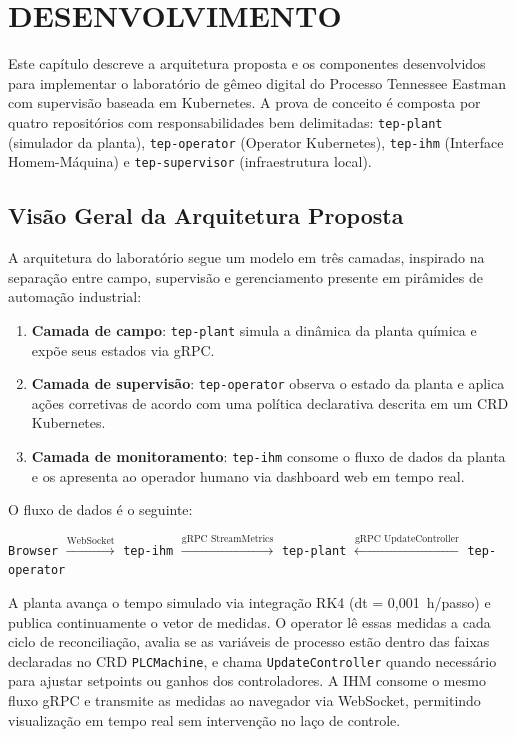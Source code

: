 \chapter{DESENVOLVIMENTO}
\label{cha:desenvolvimento}

Este capítulo descreve a arquitetura proposta e os componentes desenvolvidos para implementar o laboratório de gêmeo digital do Processo Tennessee Eastman com supervisão baseada em Kubernetes. A prova de conceito é composta por quatro repositórios com responsabilidades bem delimitadas: \texttt{tep-plant} (simulador da planta), \texttt{tep-operator} (Operator Kubernetes), \texttt{tep-ihm} (Interface Homem-Máquina) e \texttt{tep-supervisor} (infraestrutura local).

\section{Visão Geral da Arquitetura Proposta}
\label{sec:arch}

A arquitetura do laboratório segue um modelo em três camadas, inspirado na separação entre campo, supervisão e gerenciamento presente em pirâmides de automação industrial:

\begin{enumerate}
  \item \textbf{Camada de campo}: \texttt{tep-plant} simula a dinâmica da planta química e expõe seus estados via gRPC.
  \item \textbf{Camada de supervisão}: \texttt{tep-operator} observa o estado da planta e aplica ações corretivas de acordo com uma política declarativa descrita em um CRD Kubernetes.
  \item \textbf{Camada de monitoramento}: \texttt{tep-ihm} consome o fluxo de dados da planta e os apresenta ao operador humano via dashboard web em tempo real.
\end{enumerate}

O fluxo de dados é o seguinte:

\begin{center}
\texttt{Browser} $\xrightarrow{\text{WebSocket}}$ \texttt{tep-ihm} $\xrightarrow{\text{gRPC StreamMetrics}}$ \texttt{tep-plant} $\xleftarrow{\text{gRPC UpdateController}}$ \texttt{tep-operator}
\end{center}

A planta avança o tempo simulado via integração RK4 (dt = 0,001~h/passo) e publica continuamente o vetor de medidas. O operator lê essas medidas a cada ciclo de reconciliação, avalia se as variáveis de processo estão dentro das faixas declaradas no CRD \texttt{PLCMachine}, e chama \texttt{UpdateController} quando necessário para ajustar setpoints ou ganhos dos controladores. A IHM consome o mesmo fluxo gRPC e transmite as medidas ao navegador via WebSocket, permitindo visualização em tempo real sem intervenção no laço de controle.

